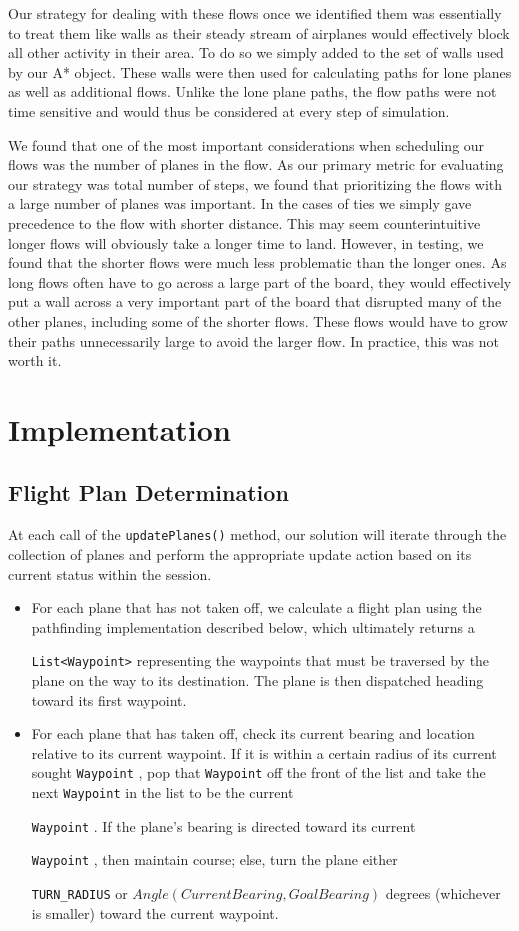 \documentclass[10pt]{article}
\newcommand{\ms}[1] {
  \texttt{#1}
}
\begin{document}
Our strategy for dealing with these flows once we identified them was essentially to treat them like walls as their steady stream of airplanes would effectively block all other activity in their area. To do so we simply added to the set of walls used by our A* object. These walls were then used for calculating paths for lone planes as well as additional flows. Unlike the lone plane paths, the flow paths were not time sensitive and would thus be considered at every step of simulation.

We found that one of the most important considerations when scheduling our flows was the number of planes in the flow. As our primary metric for evaluating our strategy was total number of steps, we found that prioritizing the flows with a large number of planes was important. In the cases of ties we simply gave precedence to the flow with shorter distance. This may seem counterintuitive longer flows will obviously take a longer time to land. However, in testing, we found that the shorter flows were much less problematic than the longer ones. As long flows often have to go across a large part of the board, they would effectively put a wall across a very important part of the board that disrupted many of the other planes, including some of the shorter flows. These flows would have to grow their paths unnecessarily large to avoid the larger flow. In practice, this was not worth it.

\newpage
\section{Implementation}

\subsection{Flight Plan Determination}
At each call of the \ms{updatePlanes()} method, our solution will iterate through the collection of 
planes and perform the appropriate update action based on its current status within the session.
\begin{itemize}
  \item For each plane that has not taken off, we calculate a flight plan using
    the pathfinding implementation described below, which ultimately returns a
    \ms{List<Waypoint>} representing the waypoints that must be traversed by the
    plane on the way to its destination. The plane is then dispatched heading
    toward its first waypoint.
  \item For each plane that has taken off, check its current bearing and
    location relative to its current waypoint. If it is within a certain radius
    of its current sought \ms{Waypoint}, pop that \ms{Waypoint} off the front of
    the list and take the next \ms{Waypoint} in the list to be the current
    \ms{Waypoint}. If the plane's bearing is directed toward its current
    \ms{Waypoint}, then maintain course; else, turn the plane either
    \ms{TURN\_RADIUS} or $Angle(Current Bearing, Goal Bearing)$ degrees
    (whichever is smaller) toward the current waypoint. 
\end{itemize}
\end{document}
